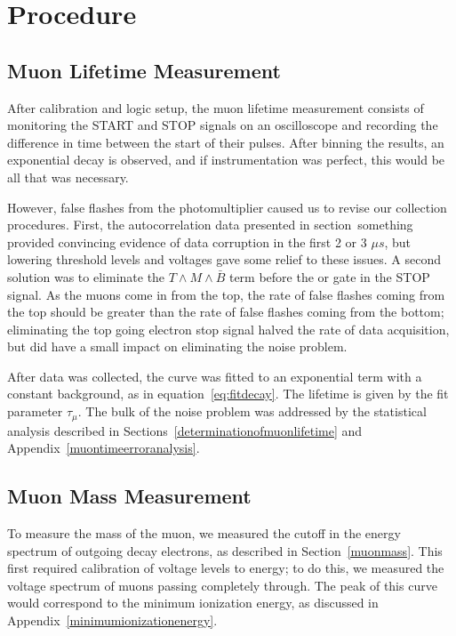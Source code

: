 \section{Procedure}\label{procedure}

\subsection{Muon Lifetime Measurement}
\label{muonlifetimemeasurement}

After calibration and logic setup, the muon lifetime measurement consists of monitoring the START and STOP signals on an oscilloscope and recording the difference in time between the start of their pulses. After binning the results, an exponential decay is observed, and if instrumentation was perfect, this would be all that was necessary.

However, false flashes from the photomultiplier caused us to revise our collection procedures. First, the autocorrelation data presented in section~something provided convincing evidence of data corruption in the first 2 or 3 $\mu s$, but lowering threshold levels and voltages gave some relief to these issues. A second solution was to eliminate the $T \wedge M \wedge \bar{B}$ term before the or gate in the STOP signal. As the muons come in from the top, the rate of false flashes coming from the top should be greater than the rate of false flashes coming from the bottom; eliminating the top going electron stop signal halved the rate of data acquisition, but did have a small impact on eliminating the noise problem. 

After data was collected, the curve was fitted to an exponential term with a constant background, as in equation~\eqref{eq:fitdecay}. The lifetime is given by the fit parameter $\tau_{\mu}$. The bulk of the noise problem was addressed by the statistical analysis described in Sections~\ref{determinationofmuonlifetime} and Appendix~\ref{muontimeerroranalysis}.

\subsection{Muon Mass Measurement}
\label{muonmassmeasurement}

To measure the mass of the muon, we measured the cutoff in the energy spectrum of outgoing decay electrons, as described in Section~\ref{muonmass}. This first required calibration of voltage levels to energy; to do this, we measured the voltage spectrum of muons passing completely through. The peak of this curve would correspond to the minimum ionization energy, as discussed in Appendix~\ref{minimumionizationenergy}. 

